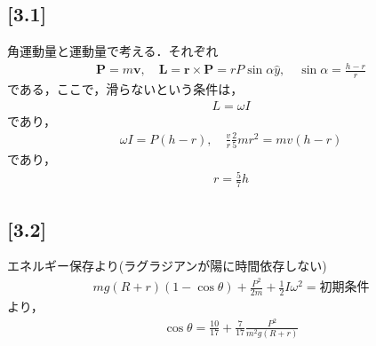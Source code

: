 \documentclass[12pt,dvipdfmx]{jsarticle}
\begin{document}
\subsection*{\large{[3.1]}}
角運動量と運動量で考える．それぞれ
\begin{eqnarray}
  \bm{P} = m\bm{v},\quad \bm{L} = \bm{r}\times \bm{P} = rP\sin\alpha \hat{y},\quad \sin\alpha = \frac{h-r}{r}
\end{eqnarray}
である，ここで，滑らないという条件は，
\begin{eqnarray}
  L = \omega I
\end{eqnarray}
であり，
\begin{eqnarray}
  \omega I = P(h-r),\quad \frac{v}{r}\frac{2}{5}mr^2 = mv (h-r)
\end{eqnarray}
であり，
\begin{eqnarray}
  r = \frac{5}{7}h
\end{eqnarray}
\subsection*{\large{[3.2]}}
エネルギー保存より(ラグラジアンが陽に時間依存しない)
\begin{eqnarray}
  mg(R+r)(1-\cos\theta) + \frac{P^2}{2m} + \frac{1}{2}I\omega^2 = 初期条件
\end{eqnarray}
より，
\begin{eqnarray}
  \cos\theta = \frac{10}{17} + \frac{7}{17}\frac{P^2}{m^2 g (R+r)}
\end{eqnarray}
\end{document}
